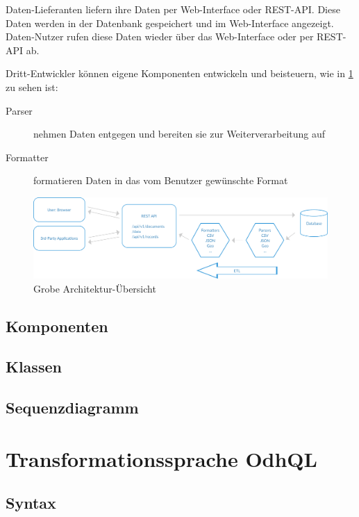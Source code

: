 Daten-Lieferanten liefern ihre Daten per Web-Interface oder REST-API. Diese Daten werden in der Datenbank gespeichert und im Web-Interface angezeigt. Daten-Nutzer rufen diese Daten wieder über das Web-Interface oder per REST-API ab. 

Dritt-Entwickler können eigene Komponenten entwickeln und beisteuern, wie in \cref{fig:pd:arch-overview} zu sehen ist:
\begin{description}
\item[Parser] nehmen Daten entgegen und bereiten sie zur Weiterverarbeitung auf
\item[Formatter] formatieren Daten in das vom Benutzer gewünschte Format
\end{description}

\begin{figure}[H]
    \centering
    \includegraphics[width=\linewidth]{fig/ODH-Architecture-Overview}
    \caption{Grobe Architektur-Übersicht}
    \label{fig:pd:arch-overview}
\end{figure}

\subsection{Komponenten}


\subsection{Klassen}


\subsection{Sequenzdiagramm}


\section{Transformationssprache OdhQL}

\subsection{Syntax}

